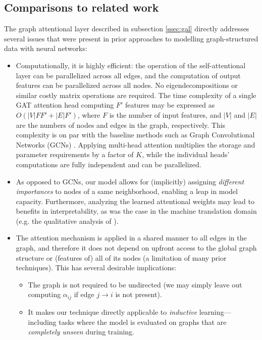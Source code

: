 \documentclass{article} %
\begin{document}
\subsection{Comparisons to related work}\label{secdisc}
The graph attentional layer described in subsection \ref{ssec:gal} directly addresses several issues that were present in prior approaches to modelling graph-structured data with neural networks:
\begin{itemize}
	\item Computationally, it is highly efficient: the operation of the self-attentional layer can be parallelized across all edges, and the computation of output features can be parallelized across all nodes. No eigendecompositions or similar costly matrix operations are required. The time complexity of a single GAT attention head computing $F'$ features may be expressed as $O(|V|FF' + |E|F')$, where $F$ is the number of input features, and $|V|$ and $|E|$ are the numbers of nodes and edges in the graph, respectively. This complexity is on par with the baseline methods such as Graph Convolutional Networks (GCNs) \citep{kipf2016semi}. Applying multi-head attention multiplies the storage and parameter requirements by a factor of $K$, while the individual heads' computations are fully independent and can be parallelized.
    \item As opposed to GCNs, our model allows for (implicitly) assigning \emph{different importances} to nodes of a same neighborhood, enabling a leap in model capacity. Furthermore, analyzing the learned attentional weights may lead to benefits in interpretability, as was the case in the machine translation domain (e.g. the qualitative analysis of \cite{bahdanau2014neural}).
    \item The attention mechanism is applied in a shared manner to all edges in the graph, and therefore it does not depend on upfront access to the global graph structure or (features of) all of its nodes (a limitation of many prior techniques). This has several desirable implications:
    \begin{itemize}
        \item The graph is not required to be undirected (we may simply leave out computing $\alpha_{ij}$ if edge $j\rightarrow i$ is not present).
        \item It makes our technique directly applicable to \emph{inductive} learning---including tasks where the model is evaluated on graphs that are \emph{completely unseen} during training. 
    \end{itemize}

\end{itemize}
\end{document}
